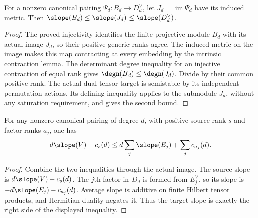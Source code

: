 \begin{lemma}
\label{lem:canonical-pairing-image-slope}
\leanok
{}
For a nonzero canonical pairing $\Psi_d:B_d\to D_d^\vee$, let
$J_d=\operatorname{im}\Psi_d$ have its induced metric. Then
$\slope(B_d)\leq\slope(J_d)\leq\slope(D_d^\vee)$.
\end{lemma}
\begin{proof}
The proved injectivity identifies the finite projective module $B_d$
with its actual image $J_d$, so their positive generic ranks agree.
The induced metric on the image makes this map contracting at every
embedding by the intrinsic contraction lemma. The determinant degree
inequality for an injective contraction of equal rank gives
$\degn(B_d)\leq\degn(J_d)$. Divide by their common positive rank.
The actual dual tensor target is semistable by its independent
permutation actions. Its defining inequality applies to the submodule
$J_d$, without any saturation requirement, and gives the second bound.
\end{proof}

\begin{lemma}
\label{lem:canonical-pairing-finite-degree}
\leanok
{}
For any nonzero canonical pairing of degree $d$, with positive source
rank $s$ and factor ranks $a_j$, one has
\[
d\slope(V)-c_s(d)\leq d\sum_j\slope(E_j)+\sum_jc_{a_j}(d).
\]
\end{lemma}
\begin{proof}
Combine the two inequalities through the actual image. The source
slope is $d\slope(V)-c_s(d)$. The $j$th factor in $D_d$ is formed
from $E_j^\vee$, so its slope is $-d\slope(E_j)-c_{a_j}(d)$.
Average slope is additive on finite Hilbert tensor products, and
Hermitian duality negates it. Thus the target slope is exactly the
right side of the displayed inequality.
\end{proof}

